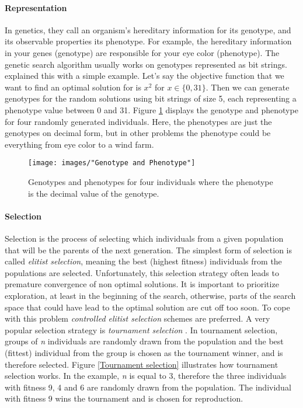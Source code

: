 \paragraph*{Representation}
In genetics, they call an organism's hereditary information for its genotype, and its observable properties its phenotype. For example, the hereditary information in your genes (genotype) are responsible for your eye color (phenotype). The genetic search algorithm usually works on genotypes represented as bit strings. \cite{Goldberg} explained this with a simple example. Let's say the objective function that we want to find an optimal solution for is $x^2$ for $x \in \{0, 31\}$. Then we can generate genotypes for the random solutions using bit strings of size 5, each representing a phenotype value between 0 and 31. Figure \ref{Representation} displays the genotype and phenotype for four randomly generated individuals. Here, the phenotypes are just the genotypes on decimal form, but in other problems the phenotype could be everything from eye color to a wind farm.


\begin{figure}[h!]
\begin{center}
\texttt{[image: images/"Genotype and Phenotype"]}
\caption{Genotypes and phenotypes for four individuals where the phenotype is the decimal value of the genotype.}
\label{Representation}
\end{center}
\end{figure}


\paragraph*{Selection}
Selection is the process of selecting which individuals from a given population that will be the parents of the next generation. The simplest form of selection is called \textit{elitist selection}, meaning the best (highest fitness) individuals from the populations are selected. Unfortunately, this selection strategy often leads to premature convergence of non optimal solutions. It is important to prioritize exploration, at least in the beginning of the search, otherwise, parts of the search space that could have lead to the optimal solution are cut off too soon. To cope with this problem \textit{controlled elitist selection} schemes are preferred. A very popular selection strategy is \textit{tournament selection} \citep{Razali}. In tournament selection, groups of \textit{n} individuals are randomly drawn from the population and the best (fittest) individual from the group is chosen as the tournament winner, and is therefore selected. Figure \ref{Tournament selection} illustrates how tournament selection works. In the example, \textit{n} is equal to 3, therefore the three individuals with fitness 9, 4 and 6 are randomly drawn from the population. The individual with fitness 9 wins the tournament and is chosen for reproduction.\\


